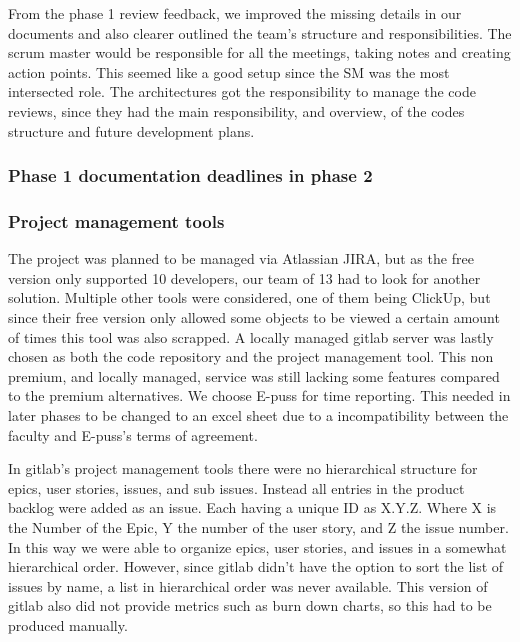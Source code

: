 \documentclass{article}
\begin{document}
From the phase 1 review feedback, we improved the missing details in our documents and also clearer outlined the team's structure and responsibilities. The scrum master would be responsible for all the meetings, taking notes and creating action points. This seemed like a good setup since the SM was the most intersected role. The architectures got the responsibility to manage the code reviews, since they had the main responsibility, and overview, of the codes structure and future development plans.

\subsubsection{Phase 1 documentation deadlines in phase 2}

\subsubsection{Project management tools} 

The project was planned to be managed via Atlassian JIRA, but as the free version only supported 10 developers, our team of 13 had to look for another solution. Multiple other tools were considered, one of them being ClickUp, but since their free version only allowed some objects to be viewed a certain amount of times this tool was also scrapped. A locally managed gitlab server was lastly chosen as both the code repository and the project management tool. This non premium, and locally managed, service was still lacking some features compared to the premium alternatives. We choose E-puss for time reporting. This needed in later phases to be changed to an excel sheet due to a incompatibility between the faculty and E-puss's terms of agreement.

In gitlab's project management tools there were no hierarchical structure for epics, user stories, issues, and sub issues. Instead all entries in the product backlog were added as an issue. Each having a unique ID as X.Y.Z. Where X is the Number of the Epic, Y the number of the user story, and Z the issue number. In this way we were able to organize epics, user stories, and issues in a somewhat hierarchical order. However, since gitlab didn't have the option to sort the list of issues by name, a list in hierarchical order was never available. This version of gitlab also did not provide metrics such as burn down charts, so this had to be produced manually.
\end{document}
